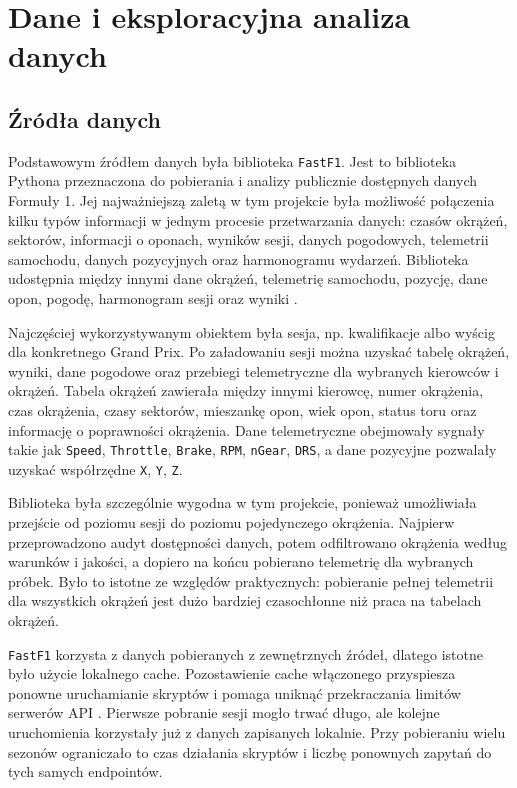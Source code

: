 \documentclass[printmode,pl]{mgr}
\begin{document}
\chapter{Dane i eksploracyjna analiza danych}

\section{Źródła danych}

Podstawowym źródłem danych była biblioteka \texttt{FastF1}. Jest to biblioteka Pythona przeznaczona do pobierania i analizy publicznie dostępnych danych Formuły 1. Jej najważniejszą zaletą w tym projekcie była możliwość połączenia kilku typów informacji w jednym procesie przetwarzania danych: czasów okrążeń, sektorów, informacji o oponach, wyników sesji, danych pogodowych, telemetrii samochodu, danych pozycyjnych oraz harmonogramu wydarzeń. Biblioteka udostępnia między innymi dane okrążeń, telemetrię samochodu, pozycję, dane opon, pogodę, harmonogram sesji oraz wyniki \cite{fastf1_docs}.

Najczęściej wykorzystywanym obiektem była sesja, np. kwalifikacje albo wyścig dla konkretnego Grand Prix. Po załadowaniu sesji można uzyskać tabelę okrążeń, wyniki, dane pogodowe oraz przebiegi telemetryczne dla wybranych kierowców i okrążeń. Tabela okrążeń zawierała między innymi kierowcę, numer okrążenia, czas okrążenia, czasy sektorów, mieszankę opon, wiek opon, status toru oraz informację o poprawności okrążenia. Dane telemetryczne obejmowały sygnały takie jak \texttt{Speed}, \texttt{Throttle}, \texttt{Brake}, \texttt{RPM}, \texttt{nGear}, \texttt{DRS}, a dane pozycyjne pozwalały uzyskać współrzędne \texttt{X}, \texttt{Y}, \texttt{Z}.

Biblioteka była szczególnie wygodna w tym projekcie, ponieważ umożliwiała przejście od poziomu sesji do poziomu pojedynczego okrążenia. Najpierw przeprowadzono audyt dostępności danych, potem odfiltrowano okrążenia według warunków i jakości, a dopiero na końcu pobierano telemetrię dla wybranych próbek. Było to istotne ze względów praktycznych: pobieranie pełnej telemetrii dla wszystkich okrążeń jest dużo bardziej czasochłonne niż praca na tabelach okrążeń.

\texttt{FastF1} korzysta z danych pobieranych z zewnętrznych źródeł, dlatego istotne było użycie lokalnego cache. Pozostawienie cache włączonego przyspiesza ponowne uruchamianie skryptów i pomaga uniknąć przekraczania limitów serwerów API \cite{fastf1_docs}. Pierwsze pobranie sesji mogło trwać długo, ale kolejne uruchomienia korzystały już z danych zapisanych lokalnie. Przy pobieraniu wielu sezonów ograniczało to czas działania skryptów i liczbę ponownych zapytań do tych samych endpointów.
\end{document}

